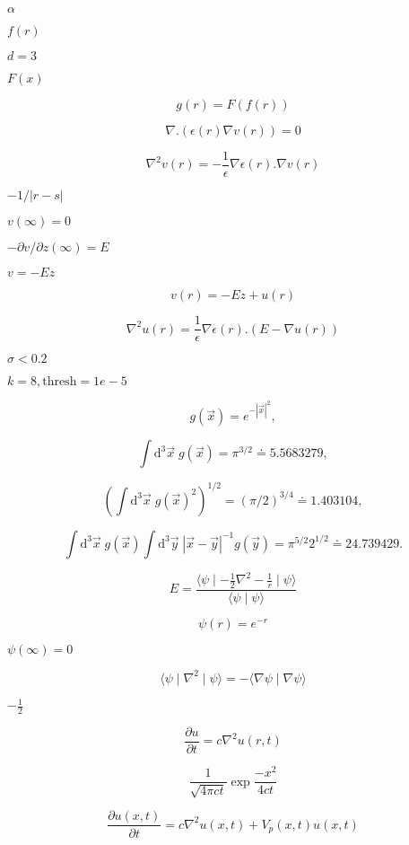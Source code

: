 \documentclass{article}
\begin{document}
$\alpha$
\pagebreak

$f(r)$
\pagebreak

$d=3$
\pagebreak

$F(x)$
\pagebreak

\[ g(r) = F(f(r)) \]
\pagebreak

\[ \nabla . \left( \epsilon(r) \nabla v(r) \right) = 0 \]
\pagebreak

\[ \nabla^2 v(r) = - \frac{1}{\epsilon} \nabla \epsilon(r) . \nabla v(r) \]
\pagebreak

$-1 / |r-s|$
\pagebreak

$v(\infty)=0$
\pagebreak

$- \partial v / \partial z(\infty) = E$
\pagebreak

$v = - E z$
\pagebreak

\[ v(r) = - E z + u(r) \]
\pagebreak

\[ \nabla^2 u(r) = \frac{1}{\epsilon} \nabla \epsilon(r) . \left(E - \nabla u(r) \right) \]
\pagebreak

$\sigma<0.2$
\pagebreak

$k=8, \mbox{thresh}=1e-5$
\pagebreak

\[ g(\vec{x}) = e^{-|\vec{x}|^2}, \]
\pagebreak

\[ \int \mathrm{d}^3 \vec{x} \; g(\vec{x}) = \pi^{3/2} \doteq 5.5683279, \]
\pagebreak

\[ \left( \int \mathrm{d}^3 \vec{x} \; g(\vec{x})^2 \right)^{1/2} = (\pi/2)^{3/4} \doteq 1.403104, \]
\pagebreak

\[ \int \mathrm{d}^3 \vec{x} \; g(\vec{x}) \int \mathrm{d}^3 \vec{y} \; |\vec{x}-\vec{y}|^{-1} g(\vec{y}) = \pi^{5/2} 2^{1/2} \doteq 24.739429. \]
\pagebreak

\[ E = \frac{\langle \psi \mid - \frac{1}{2} \nabla^2 - \frac{1}{r} \mid \psi \rangle}{\langle \psi \mid \psi \rangle} \]
\pagebreak

\[ \psi(r) = e^{-r} \]
\pagebreak

$ \psi(\infty)=0 $
\pagebreak

\[ \langle \psi \mid \nabla^2 \mid \psi \rangle = - \langle \nabla \psi \mid \nabla \psi \rangle \]
\pagebreak

$-\frac{1}{2}$
\pagebreak

\[ \frac{\partial u}{\partial t} = c \nabla^2 u(r,t) \]
\pagebreak

\[ \frac{1}{\sqrt{4 \pi c t}} \exp \frac{-x^2}{4 c t} \]
\pagebreak

\[ \frac{\partial u(x,t)}{\partial t} = c \nabla^2 u(x,t) + V_p(x,t) u(x,t) \]
\pagebreak
\end{document}
